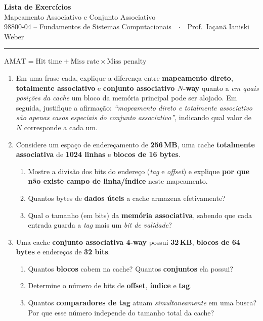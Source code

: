 \documentclass[10pt, a4paper]{article}
\begin{document}
\begin{center}
  {\Large \textbf{Lista de Exerc\'{i}cios}}\\[2pt]
  {\large Mapeamento Associativo e Conjunto Associativo}\\[3pt]
  {\normalsize 98800-04 -- Fundamentos de Sistemas Computacionais\ \ $\cdot$\ \ Prof.\ Ia\c{c}an\~{a} Ianiski Weber}
\end{center}

\vspace{1pt}
\hrule
\vspace{4pt}

\begin{formulario}
\small
$\text{AMAT} = \text{Hit time} + \text{Miss rate}\times\text{Miss penalty}$
\end{formulario}

\begin{enumerate}

\item Em uma frase cada, explique a diferen\c{c}a entre \textbf{mapeamento direto}, \textbf{totalmente associativo} e \textbf{conjunto associativo $N$-way} quanto a \emph{em quais posi\c{c}\~{o}es da cache} um bloco da mem\'{o}ria principal pode ser alojado. Em seguida, justifique a afirma\c{c}\~{a}o: \emph{``mapeamento direto e totalmente associativo s\~{a}o apenas casos especiais do conjunto associativo''}, indicando qual valor de $N$ corresponde a cada um.

\item Considere um espa\c{c}o de endere\c{c}amento de \textbf{256\,MB}, uma cache \textbf{totalmente associativa} de \textbf{1024 linhas} e \textbf{blocos de 16 bytes}.
\begin{enumerate}
  \item Mostre a divis\~{a}o dos bits do endere\c{c}o (\emph{tag} e \emph{offset}) e explique \textbf{por que n\~{a}o existe campo de linha/\'{i}ndice} neste mapeamento.
  \item Quantos bytes de \textbf{dados \'{u}teis} a cache armazena efetivamente?
  \item Qual o tamanho (em bits) da \textbf{mem\'{o}ria associativa}, sabendo que cada entrada guarda a \emph{tag} mais um \emph{bit de validade}?
\end{enumerate}

\item Uma cache \textbf{conjunto associativa 4-way} possui \textbf{32\,KB}, \textbf{blocos de 64 bytes} e endere\c{c}os de \textbf{32 bits}.
\begin{enumerate}
  \item Quantos \textbf{blocos} cabem na cache? Quantos \textbf{conjuntos} ela possui?
  \item Determine o n\'{u}mero de bits de \textbf{offset}, \textbf{\'{i}ndice} e \textbf{tag}.
  \item Quantos \textbf{comparadores de tag} atuam \emph{simultaneamente} em uma busca? Por que esse n\'{u}mero independe do tamanho total da cache?
\end{enumerate}


\end{enumerate}
\end{document}
